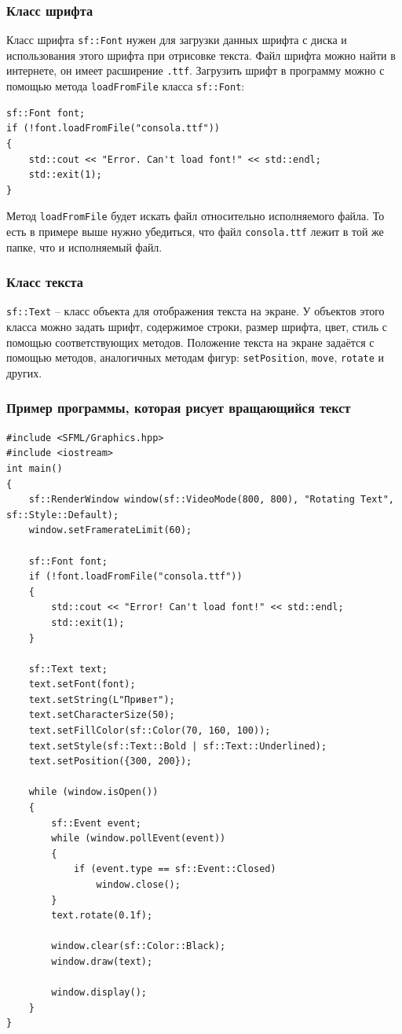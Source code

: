 \documentclass{article}
\begin{document}
\subsubsection*{Класс шрифта}
Класс шрифта \texttt{sf::Font} нужен для загрузки данных шрифта с диска и использования этого шрифта при отрисовке текста. Файл шрифта можно найти в интернете, он имеет расширение \texttt{.ttf}. Загрузить шрифт в программу можно с помощью метода \texttt{loadFromFile} класса \texttt{sf::Font}:
\begin{lstlisting}
sf::Font font;
if (!font.loadFromFile("consola.ttf")) 
{
    std::cout << "Error. Can't load font!" << std::endl;
    std::exit(1);
}
\end{lstlisting}
Метод \texttt{loadFromFile} будет искать файл относительно исполняемого файла. То есть в примере выше нужно убедиться, что файл \texttt{consola.ttf} лежит в той же папке, что и исполняемый файл.

\subsubsection*{Класс текста}
\texttt{sf::Text} -- класс объекта для отображения текста на экране.
У объектов этого класса можно задать шрифт, содержимое строки, размер шрифта, цвет, стиль с помощью соответствующих методов. Положение текста на экране задаётся с помощью методов, аналогичных методам фигур: \texttt{setPosition}, \texttt{move}, \texttt{rotate} и других.


\newpage
\subsubsection*{Пример программы, которая рисует вращающийся текст}
\begin{lstlisting}
#include <SFML/Graphics.hpp>
#include <iostream>
int main()
{
    sf::RenderWindow window(sf::VideoMode(800, 800), "Rotating Text", sf::Style::Default);
    window.setFramerateLimit(60);
    
    sf::Font font;
    if (!font.loadFromFile("consola.ttf")) 
    {
        std::cout << "Error! Can't load font!" << std::endl;
        std::exit(1);
    }

    sf::Text text;
    text.setFont(font);
    text.setString(L"Привет");
    text.setCharacterSize(50);
    text.setFillColor(sf::Color(70, 160, 100));
    text.setStyle(sf::Text::Bold | sf::Text::Underlined);
    text.setPosition({300, 200});

    while (window.isOpen())
    {
        sf::Event event;
        while (window.pollEvent(event)) 
        {
            if (event.type == sf::Event::Closed)
                window.close();
        }
        text.rotate(0.1f);

        window.clear(sf::Color::Black);
        window.draw(text);

        window.display();
    }
}
\end{lstlisting}
\end{document}
